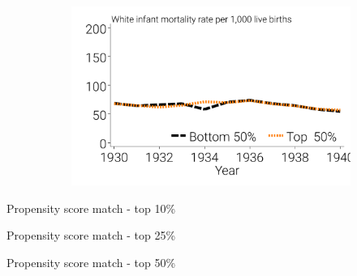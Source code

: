 \documentclass[12pt]{article}
\begin{document}
\begin{landscape}
\begin{figure}[!ht]
\begin{minipage}{\linewidth}
\begin{subfigure}[b]{0.33\columnwidth}
        \includegraphics[width=\linewidth]{../analysis/output/appendix/figure_m1c3_psm_top500pct_fake_treat_clean_cntrls_white_imr_by_treatment_over_time.pdf}
    \end{subfigure}
    \end{minipage}
    \label{fig:psm-comparison-raw_data}
\end{figure}

\begin{table}[ht]
    \centering
    \caption{Propensity score match - top 10\%}
    \begin{adjustbox}{width=\linewidth}
    \begin{threeparttable}
    \end{threeparttable}
\end{adjustbox}
\label{tab:clean-controls-psm-10}
\end{table}

\begin{table}[ht]
    \centering
    \caption{Propensity score match - top 25\%}
    \begin{adjustbox}{width=\linewidth}
    \begin{threeparttable}
    \end{threeparttable}
\end{adjustbox}
\label{tab:clean-controls-psm-25}
\end{table}

\begin{table}[ht]
    \centering
    \caption{Propensity score match - top 50\%}
    \begin{adjustbox}{width=\linewidth}
    \begin{threeparttable}
    \end{threeparttable}
\end{adjustbox}
\label{tab:clean-controls-psm-50}
\end{table}
\end{landscape}
\end{document}
